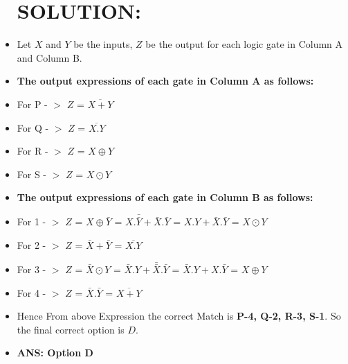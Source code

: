 \documentclass[a4paper,12pt]{article}
\begin{document}
\begin{itemize}[label={}, leftmargin=0pt]
\section*{\textbf{\large SOLUTION: }}
	\item Let $X$ and $Y$ be the inputs, $Z$ be the output for each logic gate in Column A and Column B.
	\item \textbf{The output expressions of each gate in Column A as follows:}
	\item For P - $>$ $Z$ = $\overline{X+Y}$
	\item For Q - $>$ $Z$ = $\overline{X.Y}$
	\item For R - $>$ $Z$ = $X \oplus Y$
	\item For S - $>$ $Z$ = $X \odot Y$
	\item \textbf{The output expressions of each gate in Column B as follows:}
	\item For 1 - $>$ $Z$ = $X \oplus \bar{Y}$ = $X.\bar{\bar{Y}}+\bar{X}.\bar{Y}$ = $X.Y+\bar{X}.\bar{Y}$ = $X \odot Y$
	\item For 2 - $>$ $Z$ = $\bar{X} + \bar{Y}$ = $\overline{X.Y}$
	\item For 3 - $>$ $Z$ = $\bar{X} \odot Y$ = $\bar{X}.Y+\bar{\bar{X}}.\bar{Y}$ = $\bar{X}.Y+X.\bar{Y}$ = $X \oplus Y$
	\item For 4 - $>$ $Z$ = $\bar{X} . \bar{Y}$ = $\overline{X+Y}$
	\item Hence From above Expression the correct Match is \textbf{P-4, Q-2, R-3, S-1}. So the final correct option is \textbf{$D$}.
	\item \textbf{\large ANS: Option D}
\end{itemize}
\end{document}

